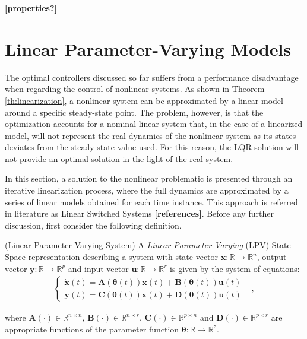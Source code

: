 \documentclass[a4paper,11pt]{book}
\numberwithin{figure}{chapter}
\numberwithin{equation}{chapter}
\numberwithin{table}{chapter}
\theoremstyle{definition}
\newtheorem{definition}{Definition}[chapter]
\newcounter{boxed-theorem}
\newcounter{boxed-definition}
\newenvironment{boxed-definition}[1]
{\begin{shaded} \begin{definition}{#1}}
{\end{definition} \end{shaded}}
\begin{document}
\textbf{[properties?]}

\section{Linear Parameter-Varying Models}

The optimal controllers discussed so far suffers from a performance disadvantage when regarding the control of nonlinear systems. As shown in Theorem \ref{th:linearization}, a nonlinear system can be approximated by a linear model around a specific steady-state point. The problem, however, is that the optimization accounts for a nominal linear system that, in the case of a linearized model, will not represent the real dynamics of the nonlinear system as its states deviates from the steady-state value used. For this reason, the LQR solution will not provide an optimal solution in the light of the real system.

In this section, a solution to the nonlinear problematic is presented through an iterative linearization process, where the full dynamics are approximated by a series of linear models obtained for each time instance. This approach is referred in literature as Linear Switched Systems \textbf{[references]}. Before any further discussion, first consider the following definition.

\begin{boxed-definition}{(Linear Parameter-Varying System)} \label{def:lpv}
	A \textit{Linear Parameter-Varying} (LPV) State-Space representation describing a system with state vector $\bm{x} : \mathbb{R} \rightarrow \mathbb{R}^{n}$, output vector $\bm{y} : \mathbb{R} \rightarrow \mathbb{R}^{p}$ and input vector $\bm{u} : \mathbb{R} \rightarrow \mathbb{R}^{r}$ is given by the system of equations: 
    \begin{align} \label{eq:SSRepr04}
    \begin{cases}
        \dot{\bm{x}}(t) = \bm{A}(\bm{\theta}(t)) \bm{x}(t) + \bm{B}(\bm{\theta}(t)) \bm{u}(t) & \\
        \bm{y}(t) = \bm{C}(\bm{\theta}(t)) \bm{x}(t) + \bm{D}(\bm{\theta}(t)) \bm{u}(t) &
    \end{cases}
    ,\end{align}

    \noindent where $\bm{A}(\cdot) \in \mathbb{R}^{n \times n}$, $\bm{B}(\cdot) \in \mathbb{R}^{n \times r}$, $\bm{C}(\cdot) \in \mathbb{R}^{p \times n}$ and $\bm{D}(\cdot) \in \mathbb{R}^{p \times r}$ are appropriate functions of the parameter function $\bm{\theta} : \mathbb{R} \rightarrow \mathbb{R}^{z}$. 
\end{boxed-definition}
\end{document}
